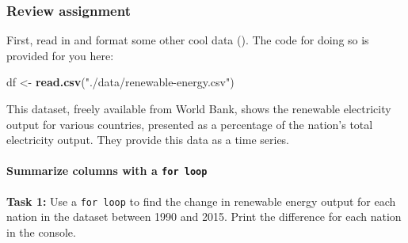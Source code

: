 \documentclass[
]{book}
\newenvironment{Shaded}{\begin{snugshade}}{\end{snugshade}}
\newcommand{\KeywordTok}[1]{\textcolor[rgb]{0.13,0.29,0.53}{\textbf{#1}}}
\newcommand{\NormalTok}[1]{#1}
\newcommand{\StringTok}[1]{\textcolor[rgb]{0.31,0.60,0.02}{#1}}
\begin{document}
\hypertarget{review-assignment-7}{%
\subsubsection*{Review assignment}\label{review-assignment-7}}

First, read in and format some other cool data (). The code for doing so is provided for you here:

\begin{Shaded}
\begin{Highlighting}[]
\NormalTok{df <-}\StringTok{ }\KeywordTok{read.csv}\NormalTok{(}\StringTok{"./data/renewable-energy.csv"}\NormalTok{)}
\end{Highlighting}
\end{Shaded}

This dataset, freely available from World Bank, shows the renewable electricity output for various countries, presented as a percentage of the nation's total electricity output. They provide this data as a time series.

\hypertarget{summarize-columns-with-a-for-loop}{%
\paragraph{\texorpdfstring{Summarize columns with a \texttt{for\ loop}}{Summarize columns with a for loop}}\label{summarize-columns-with-a-for-loop}}

\textbf{Task 1:} Use a \texttt{for\ loop} to find the change in renewable energy output for each nation in the dataset between 1990 and 2015. Print the difference for each nation in the console.
\end{document}
